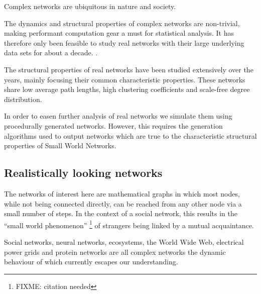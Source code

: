 \documentclass[a4paper,11pt,titlepage]{article}
\begin{document}

Complex networks are ubiquitous in nature and society.

The dynamics and structural properties of complex networks are non-trivial,
making performant computation gear a must for statistical analysis.
It has therefore only been feasible to study real networks with their
large underlying data sets for about a decade.
\cite{oconn11}.

The structural properties of real networks have been studied extensively
over the years, mainly focusing their common characteristic properties.
These networks share low average path lengths, high clustering
coefficients and scale-free degree distribution.

In order to easen further analysis of real networks we simulate them
using procedurally generated networks. However, this requires the
generation algorithms used to output networks which are true to the
characteristic structural properties of Small World Networks.

\subsection{Realistically looking networks}


The networks of interest here are mathematical graphs in which most nodes,
while not being connected directly, can be reached from any other node via a
small number of steps. In the context of a social network, this results in the
``small world phenomenon'' \footnote{FIXME: citation needed} of strangers
being linked by a mutual acquaintance.


Social networks, neural networks, ecosystems, the World Wide Web, electrical
power grids and protein networks are all complex networks the dynamic
behaviour of which currently escapes our understanding.
\end{document}
